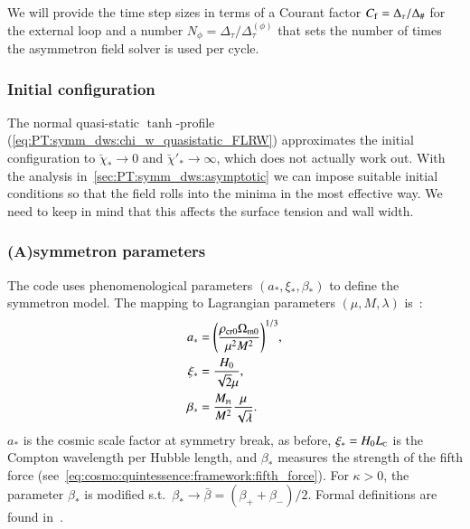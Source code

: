    We will provide the time step sizes %
    in terms of a Courant factor $C_\mathrm{f}=\Delta_\tau/\Delta_\#$ for the external loop and a number $N_\phi=\Delta_\tau/\Delta_\tau^{(\phi)}$ that sets the number of times the asymmetron field solver is used per cycle. 

\subsubsection{Initial configuration}

    The normal quasi-static $\tanh$-profile (\cref{eq:PT:symm_dws:chi_w_quasistatic_FLRW}) approximates the initial configuration to $\breve{\chi}_\ast\to0$ and $\breve{\chi}'_\ast \to \infty$, which does not actually work out. %
    With the analysis in~\cref{sec:PT:symm_dws:asymptotic} we can impose suitable initial conditions so that the field rolls into the minima in the most effective way. We need to keep in mind that this affects the surface tension and wall width.



\subsubsection{(A)symmetron parameters}
    The code uses phenomenological parameters $(a_\ast, \xi_\ast, \beta_\ast)$ to define the symmetron model. The mapping to Lagrangian parameters $(\mu, M, \lambda)$ is~\citep{christiansenAsevolutionRelativisticNbody2023}:
    \begin{subequations}\label{eq:PT:sims:mapping_symmetron_params}
        \begin{align}
            a_\ast &=  {\left( \frac{\rho_\mathrm{cr0} \Omega_\mathrm{m0}}{\mu^2 M^2} \right)}^{1/3},\\
            \xi_\ast &= \frac{H_0}{\sqrt{2}\mu}, \\
            \beta_\ast &=\frac{M_{\text{\tiny{Pl}}}}{M^2} \frac{\mu}{\sqrt{\lambda}}.
        \end{align}
    \end{subequations}
    $a_\ast$ is the cosmic scale factor at symmetry break, as before, $\xi_\ast= H_0 L_{\text{\tiny{C}}}$ is the Compton wavelength per Hubble length, and $\beta_\ast$ measures the strength of the fifth force (see~\cref{eq:cosmo:quintessence:framework:fifth_force}). %
    For $\kappa>0$, the parameter $\beta_\ast$ is modified s.t.~$\beta_\ast \to \bar{\beta}= (\beta_+ + \beta_-)/2$. Formal definitions are found in~\citet{christiansenAsevolutionRelativisticNbody2023}. %


